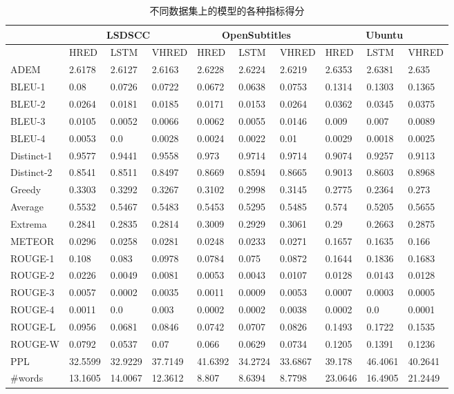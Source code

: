 \begin{table}%
\centering%
\caption{不同数据集上的模型的各种指标得分}%
\label{tab:systemscoresall}%
\begin{tabular}{|l|l|l|l|l|l|l|l|l|l|}%
\hline%
&\multicolumn{3}{c|}{LSDSCC}&\multicolumn{3}{c|}{OpenSubtitles}&\multicolumn{3}{c|}{Ubuntu}\\%
\hline%
&HRED&LSTM&VHRED&HRED&LSTM&VHRED&HRED&LSTM&VHRED\\%
\hline%
ADEM&2.6178&2.6127&2.6163&2.6228&2.6224&2.6219&2.6353&2.6381&2.635\\%
\hline%
BLEU{-}1&0.08&0.0726&0.0722&0.0672&0.0638&0.0753&0.1314&0.1303&0.1365\\%
\hline%
BLEU{-}2&0.0264&0.0181&0.0185&0.0171&0.0153&0.0264&0.0362&0.0345&0.0375\\%
\hline%
BLEU{-}3&0.0105&0.0052&0.0066&0.0062&0.0055&0.0146&0.009&0.007&0.0089\\%
\hline%
BLEU{-}4&0.0053&0.0&0.0028&0.0024&0.0022&0.01&0.0029&0.0018&0.0025\\%
\hline%
Distinct{-}1&0.9577&0.9441&0.9558&0.973&0.9714&0.9714&0.9074&0.9257&0.9113\\%
\hline%
Distinct{-}2&0.8541&0.8511&0.8497&0.8669&0.8594&0.8665&0.9013&0.8603&0.8968\\%
\hline%
Greedy&0.3303&0.3292&0.3267&0.3102&0.2998&0.3145&0.2775&0.2364&0.273\\%
\hline%
Average&0.5532&0.5467&0.5483&0.5453&0.5295&0.5485&0.574&0.5205&0.5655\\%
\hline%
Extrema&0.2841&0.2835&0.2814&0.3009&0.2929&0.3061&0.29&0.2663&0.2875\\%
\hline%
METEOR&0.0296&0.0258&0.0281&0.0248&0.0233&0.0271&0.1657&0.1635&0.166\\%
\hline%
ROUGE{-}1&0.108&0.083&0.0978&0.0784&0.075&0.0872&0.1644&0.1836&0.1683\\%
\hline%
ROUGE{-}2&0.0226&0.0049&0.0081&0.0053&0.0043&0.0107&0.0128&0.0143&0.0128\\%
\hline%
ROUGE{-}3&0.0057&0.0002&0.0035&0.0011&0.0009&0.0053&0.0007&0.0003&0.0005\\%
\hline%
ROUGE{-}4&0.0011&0.0&0.003&0.0002&0.0002&0.0038&0.0002&0.0&0.0001\\%
\hline%
ROUGE{-}L&0.0956&0.0681&0.0846&0.0742&0.0707&0.0826&0.1493&0.1722&0.1535\\%
\hline%
ROUGE{-}W&0.0792&0.0537&0.07&0.066&0.0629&0.0734&0.1205&0.1391&0.1236\\%
\hline%
PPL&32.5599&32.9229&37.7149&41.6392&34.2724&33.6867&39.178&46.4061&40.2641\\%
\hline%
\#words&13.1605&14.0067&12.3612&8.807&8.6394&8.7798&23.0646&16.4905&21.2449\\%
\hline%
\end{tabular}%
\end{table}